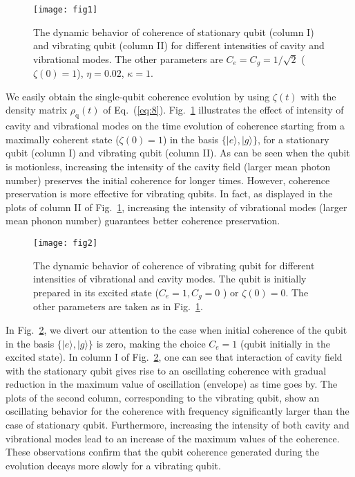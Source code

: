 \documentclass[twocolumn,3p,times]{elsarticle}
\newcommand{\ket}[1]{|#1\rangle}
\begin{document}
\begin{figure}[t!]
\texttt{[image: fig1]}
\caption{The dynamic behavior of coherence of stationary qubit (column I) and vibrating qubit (column II) for different intensities of cavity and vibrational modes. The other parameters are $C_{e}=C_{g}=1/\sqrt{2}$ ($\zeta(0)=1$), $\eta=0.02$, $\kappa=1$.}
\label{opt1}
\end{figure}

We easily obtain the single-qubit coherence evolution by using $\zeta(t)$ with the density matrix $\rho_\mathrm{q}(t)$ of Eq.~(\ref{eq:8}). Fig.~\ref{opt1} illustrates the effect of intensity of cavity and vibrational modes on the time evolution of coherence starting from a maximally coherent state ($\zeta(0)=1$) in the basis $\{\ket{e},\ket{g}\}$, for a stationary qubit (column I) and vibrating qubit (column II). As can be seen when the qubit is motionless, increasing the intensity of the cavity field (larger mean photon number) preserves the initial coherence for longer times. However, coherence preservation is more effective for vibrating qubits. In fact, as displayed in the plots of column II of Fig.~\ref{opt1}, increasing the intensity of vibrational modes (larger mean phonon number) guarantees better coherence preservation. 

\begin{figure}[t!]
\texttt{[image: fig2]}
\caption{The dynamic behavior of coherence of vibrating qubit for different intensities of vibrational and cavity  modes. The qubit is initially prepared in its excited state ($C_{e}=1, C_{g}=0$ ) or $\zeta(0)=0$. The other parameters are taken as in Fig.~\ref{opt1}.}
\label{opt2}
\end{figure}

In Fig.~\ref{opt2}, we divert our attention to the case when initial coherence of the qubit in the basis $\{\ket{e},\ket{g}\}$ is zero, making the choice $C_{e}=1$ (qubit initially in the excited state). In column I of Fig.~\ref{opt2}, one can see that interaction of cavity field with the stationary qubit gives rise to an oscillating coherence with gradual reduction in the maximum value of oscillation (envelope) as time goes by. The plots of the second column, corresponding to the vibrating qubit, show an oscillating behavior for the coherence with frequency significantly larger than the case of stationary qubit. Furthermore, increasing the intensity of both cavity and vibrational modes lead to an increase of the maximum values of the coherence. These observations confirm that the qubit coherence generated during the evolution decays more slowly for a vibrating qubit. 
\end{document}
